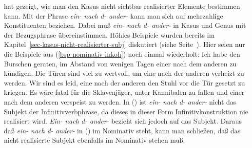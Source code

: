 \citet*[Kapitel~6]{Hoehle83a}
hat gezeigt, wie man den Kasus nicht sichtbar realisierter Elemente bestimmen kann. Mit der Phrase
{\em ein- nach d- ander-} kann 
man sich auf mehrzahlige Konstituenten beziehen. Dabei muß {\em ein- nach d- ander-}
in Kasus und Genus mit der Bezugsphrase übereinstimmen. Höhles Beispiele wurden
bereits im Kapitel~\ref{sec-kasus-nicht-realisierter-subj} diskutiert (siehe Seite~\pageref{bsp-tueren-hoehle}).
Hier seien nur die Beispiele aus (\ref{bsp-nominativ-inkoh}) noch einmal wiederholt:
\eal
\label{bsp-nominativ-inkoh-zwei}
\ex Ich habe den Burschen geraten, im Abstand von wenigen Tagen einer nach dem anderen
      zu kündigen.\label{bsp-nominativ-inkoh-geraten-zwei}
\ex Die Türen sind viel zu wertvoll, um eine nach der anderen verheizt zu werden.
\ex Wir sind es leid, eine nach der anderen den Stuhl vor die Tür gesetzt zu kriegen.
\ex Es wäre fatal für die Sklavenjäger, unter Kannibalen zu fallen und einer nach dem
      anderen verspeist zu werden.
\zl
In () ist {\em ein- nach d- ander-} nicht das Subjekt der Infinitivverbphrase,
da dieses in dieser Form Infinitivkonstruktion nie realisiert wird. {\em Ein- nach d- ander-} bezieht sich
jedoch auf das Subjekt. Daraus daß {\em ein- nach d- ander-} in () im Nominativ
steht, kann man schließen, daß das nicht realisierte Subjekt ebenfalls im Nominativ
stehen muß.

